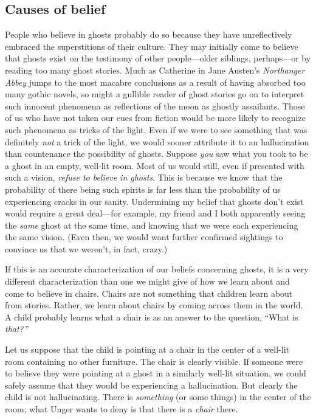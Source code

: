 \documentclass[11pt]{standalone} \newif\ifstandlone \standalonetrue
\begin{document}
\begin{spacing}{1.5}
\subsection{Causes of belief}
\label{unger-cause}
People who believe in ghosts probably do so because they have
unreflectively embraced the superstitions of their culture.  They may
initially come to believe that ghosts exist on the testimony of other
people---older siblings, perhaps---or by reading too many ghost
stories.  Much as Catherine in Jane Austen's {\em Northanger Abbey}
jumps to the most macabre conclusions as a result of having absorbed
too many gothic novels, so might a gullible reader of ghost stories go
on to interpret such innocent phenomena as reflections of the moon as
ghostly assailants.  Those of us who have not taken our cues from
fiction would be more likely to recognize such phenomena as tricks of
the light.  Even if we were to see something that was definitely {\em
  not} a trick of the light, we would sooner attribute it to an
hallucination than countenance the possibility of ghosts.  Suppose
{\em you} saw what you took to be a ghost in an empty, well-lit room.
Most of us would still, even if presented with such a vision, {\em
  refuse to believe in ghosts}.  This is because we know that the
probability of there being such spirits is far less than the
probability of us experiencing cracks in our sanity.  Undermining my
belief that ghosts don't exist would require a great deal---for
example, my friend and I both apparently seeing the {\em same} ghost
at the same time, and knowing that we were each experiencing the same
vision.  (Even then, we would want further confirmed sightings to
convince us that we weren't, in fact, crazy.)

If this is an accurate characterization of our beliefs concerning
ghosts, it is a very different characterization than one we might give
of how we learn about and come to believe in chairs.  Chairs are not
something that children learn about from stories.  Rather, we learn
about chairs by coming across them in the world.  A child probably
learns what a chair is as an answer to the question, ``What is {\em
  that?}\,''

Let us suppose that the child is pointing at a chair in the center of
a well-lit room containing no other furniture.  The chair is clearly
visible.  If someone were to believe they were pointing at a ghost in
a similarly well-lit situation, we could safely assume that they would
be experiencing a hallucination.  But clearly the child is not
hallucinating.  There is {\em something} (or some things) in the
center of the room; what Unger wants to deny is that there is a {\em
  chair} there.


\end{spacing}
\end{document}
